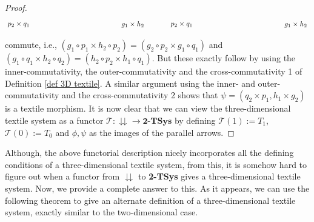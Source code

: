 \documentclass[a4paper,reqno,12pt]{amsart}
\theoremstyle{definition}
\theoremstyle{remark}
\begin{document}
\begin{proof}
\[\begin{tikzpicture}[scale=2.0]
\node at (-0.4,-0.75) {$p_2\times q_1$};
\node at (2.4,-0.75) {$g_1\times h_2$};
\node at (3.6,-0.75) {$p_2\times q_1$};
\node at (6.4,-0.75) {$g_1\times h_2$};
\end{tikzpicture}
\]
commute, i.e., $(g_1\circ p_1 \times h_2\circ p_2)=(g_2\circ p_2\times g_1\circ q_1)$ and $(g_1\circ q_1\times h_2\circ q_2)=(h_2\circ p_2\times h_1\circ q_1)$. But these exactly follow by using the inner-commutativity, the outer-commutativity and the cross-commutativity 1 of Definition \ref{def 3D textile}. A similar argument using the inner- and outer-commutativity and the cross-commutativity 2 shows that $\psi=(q_2\times p_1, h_1\times g_2)$ is a textile morphism. It is now clear that we can view the three-dimensional textile system as a functor $\mathcal{T}:\downdownarrows\longrightarrow \textbf{2-TSys}$ by defining $\mathcal{T}(1):=T_1$, $\mathcal{T}(0):=T_0$ and $\phi,\psi$ as the images of the parallel arrows.  
\end{proof}
Although, the above functorial description nicely incorporates all the defining conditions of a three-dimensional textile system, from this, it is somehow hard to figure out when a functor from $\downdownarrows$ to \textbf{2-TSys} gives a three-dimensional textile system. Now, we provide a complete answer to this. As it appears, we can use the following theorem to give an alternate definition of a three-dimensional textile system, exactly similar to the two-dimensional case.
\end{document}
